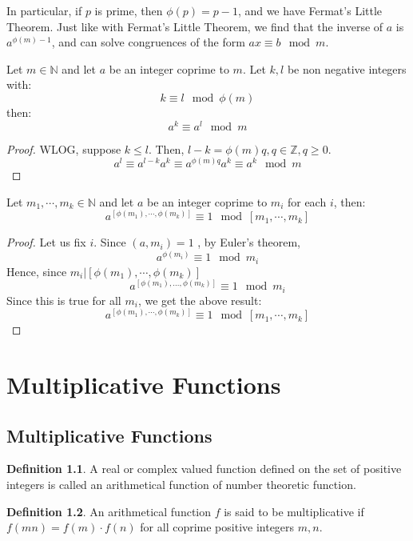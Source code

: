 \documentclass[12pt,letterpaper]{book}
\theoremstyle{definition}
\newtheorem{definition}{Definition} %
\newcommand{\N}{\mathbb{N}}
\newcommand{\Z}{\mathbb{Z}}
\begin{document}
In particular, if $p$ is prime, then $\phi(p) = p-1$, and we have Fermat's Little Theorem. Just like with Fermat's Little Theorem, we find that the inverse of $a$ is $a^{\phi(m)-1}$, and can solve congruences of the form $ax \equiv b \mod m$.

\begin{lemma}
  Let $m \in \N$ and let $a$ be an integer coprime to $m$. Let $k,l$ be non negative integers with:
  \[k \equiv l \mod \phi(m)\]
  then:
  \[a^k \equiv a^l \mod m\]
\end{lemma}
\begin{proof}
  WLOG, suppose $k \leq l$. Then, $l-k = \phi(m) q, q \in \Z, q \geq 0$.
  \[a^l \equiv a^{l-k}a^k \equiv a^{\phi(m)q}a^k \equiv a^k \mod m\]
\end{proof}

\begin{theorem}
  Let $m_1, \cdots, m_k \in \N$ and let $a$ be an integer coprime to $m_i$ for each $i$, then:
\[a^{[\phi(m_1), \cdots, \phi(m_k)]} \equiv 1 \mod [m_1 , \cdots, m_k]\]
\end{theorem}
\begin{proof}
  Let us fix $i$. Since $(a,m_i) = 1$ , by Euler's theorem,
  \[a^{\phi(m_i)} \equiv 1 \mod m_i\]
  Hence, since $m_i | [\phi(m_1) , \cdots , \phi(m_k)]$
  \[a^{[\phi(m_1), ..., \phi(m_k)]} \equiv 1 \mod m_i\]
  Since this is true for all $m_i$, we get the above result:
\[a^{[\phi(m_1), \cdots, \phi(m_k)]} \equiv 1 \mod [m_1 , \cdots, m_k]\]
\end{proof}

\chapter{Multiplicative Functions}

\section{Multiplicative Functions}

\begin{definition}
  A real or complex valued function defined on the set of positive integers is called an arithmetical function of number theoretic function.
\end{definition}

\begin{definition}
  An arithmetical function $f$ is said to be multiplicative if $f(mn) = f(m) \cdot f(n)$ for all coprime positive integers $m,n$.
\end{definition}
\end{document}
